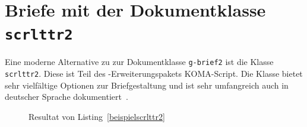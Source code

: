 \documentclass[a4paper,10pt,twoside]{scrbook}
\begin{document}
{\section{Briefe mit der Dokumentklasse \texttt{scrlttr2}}

Eine moderne Alternative zu zur Dokumentklasse \verb!g-brief2! ist die Klasse \verb!scrlttr2!. Diese ist Teil des \LaTeXe-Erweiterungspakets KOMA-Script. Die Klasse bietet sehr vielfältige Optionen zur Briefgestaltung und ist sehr umfangreich auch in deutscher Sprache dokumentiert~\cite{KOMAScript_Dokumentation}.




\begin{figure}[H]
    \caption{Resultat von Listing~\ref{beispielscrlttr2}}
    \label{fig_scrlttr2}
\end{figure}

}
\end{document}
